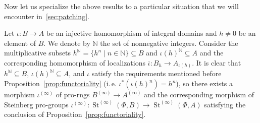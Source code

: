 \documentclass[oneside, 11pt]{amsart} \pdfoutput=1
\newcommand{\St}{\mathop{\mathrm{St}}\nolimits}
\numberwithin{equation}{section}
\theoremstyle{definition}
\begin{document}
Now let us specialize the above results to a particular situation that we will encounter in~\cref{sec:patching}.

Let $\iota \colon B \to A$ be an injective homomorphism of integral domains and $h \neq 0$ be an element of $B$.
We denote by $\mathbb N$ the set of nonnegative integers.
Consider the multiplicative subsets $h^{\mathbb{N}} = \{ h^n \mid n \in \mathbb{N} \} \subseteq B$ and $\iota(h)^\mathbb{N} \subseteq A$ and the corresponding homomorphism of localizations $\overline{\iota} \colon B_h \to A_{\iota(h)}$.
It is clear that $h^\mathbb{N} \subseteq B$, $\iota(h)^\mathbb{N} \subseteq A$, and $\iota$ satisfy the requirements mentioned before Proposition~\ref{prop:functoriality} (i.\,e. $\iota^*(\iota(h)^n) = h^n$), so there exists a morphism $\iota^{(\infty)}$ of pro-rngs $B^{(\infty)} \to A^{(\infty)}$ and the corresponding morphism of Steinberg pro-groups $\iota^{(\infty)}\colon\St^{(\infty)}(\Phi, B) \to \St^{(\infty)}(\Phi, A)$ satisfying the conclusion of Proposition~\ref{prop:functoriality}.

\end{document}

